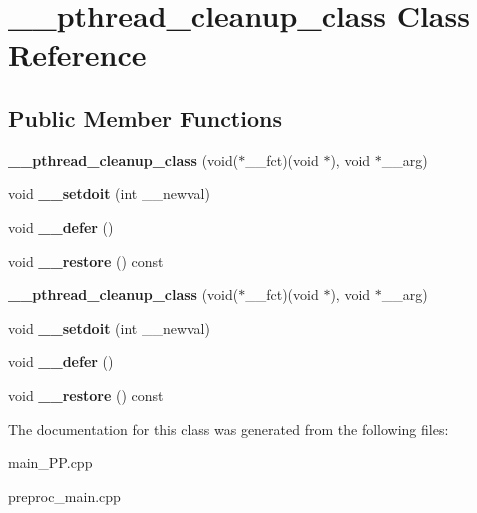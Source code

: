 \hypertarget{class____pthread__cleanup__class}{\section{\+\_\+\+\_\+pthread\+\_\+cleanup\+\_\+class Class Reference}
\label{class____pthread__cleanup__class}
}
\subsection*{Public Member Functions}
\begin{DoxyCompactItemize}
\item 
\hypertarget{class____pthread__cleanup__class_ac689d1ffda7a06f15d1393581ebe7459}{{\bfseries \+\_\+\+\_\+pthread\+\_\+cleanup\+\_\+class} (void($\ast$\+\_\+\+\_\+fct)(void $\ast$), void $\ast$\+\_\+\+\_\+arg)}\label{class____pthread__cleanup__class_ac689d1ffda7a06f15d1393581ebe7459}

\item 
\hypertarget{class____pthread__cleanup__class_ac025552d2f623fbb43fa0ac139ac9588}{void {\bfseries \+\_\+\+\_\+setdoit} (int \+\_\+\+\_\+newval)}\label{class____pthread__cleanup__class_ac025552d2f623fbb43fa0ac139ac9588}

\item 
\hypertarget{class____pthread__cleanup__class_ab6087415c2610bd4e43c8c9f7934b14b}{void {\bfseries \+\_\+\+\_\+defer} ()}\label{class____pthread__cleanup__class_ab6087415c2610bd4e43c8c9f7934b14b}

\item 
\hypertarget{class____pthread__cleanup__class_a53398c3361e3521497f02bac6f408091}{void {\bfseries \+\_\+\+\_\+restore} () const }\label{class____pthread__cleanup__class_a53398c3361e3521497f02bac6f408091}

\item 
\hypertarget{class____pthread__cleanup__class_ac689d1ffda7a06f15d1393581ebe7459}{{\bfseries \+\_\+\+\_\+pthread\+\_\+cleanup\+\_\+class} (void($\ast$\+\_\+\+\_\+fct)(void $\ast$), void $\ast$\+\_\+\+\_\+arg)}\label{class____pthread__cleanup__class_ac689d1ffda7a06f15d1393581ebe7459}

\item 
\hypertarget{class____pthread__cleanup__class_ac025552d2f623fbb43fa0ac139ac9588}{void {\bfseries \+\_\+\+\_\+setdoit} (int \+\_\+\+\_\+newval)}\label{class____pthread__cleanup__class_ac025552d2f623fbb43fa0ac139ac9588}

\item 
\hypertarget{class____pthread__cleanup__class_ab6087415c2610bd4e43c8c9f7934b14b}{void {\bfseries \+\_\+\+\_\+defer} ()}\label{class____pthread__cleanup__class_ab6087415c2610bd4e43c8c9f7934b14b}

\item 
\hypertarget{class____pthread__cleanup__class_a53398c3361e3521497f02bac6f408091}{void {\bfseries \+\_\+\+\_\+restore} () const }\label{class____pthread__cleanup__class_a53398c3361e3521497f02bac6f408091}

\end{DoxyCompactItemize}


The documentation for this class was generated from the following files\+:\begin{DoxyCompactItemize}
\item 
main\+\_\+\+P\+P.\+cpp\item 
preproc\+\_\+main.\+cpp\end{DoxyCompactItemize}
